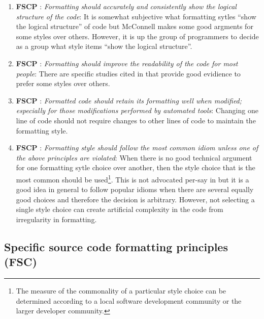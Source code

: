 \begin{enumerate}

{}\item{}\textbf{FSCP }:
{}\textit{Formatting should accurately and consistently show the logical
structure of the code}: It is somewhat subjective what formatting sytles
``show the logical structure'' of code but McConnell makes some good argments
for some styles over others.  However, it is up the group of programmers to
decide as a group what style items ``show the logical structure''.

{}\item{}\textbf{FSCP }:
{}\textit{Formatting should improve the readability of the code for most
people}: There are specific studies cited in {}\cite[Chapter
31]{CodeComplete2nd04} that provide good evidience to prefer some styles over
others.

{}\item{}\textbf{FSCP
}: {}\textit{Formatted code should retain its
formatting well when modified; especially for those modifications performed by
automated tools}: Changing one line of code should not require changes to
other lines of code to maintain the formatting style.

{}\item{}\textbf{FSCP
}: {}\textit{Formatting style should follow the
most common idiom unless one of the above principles are violated}: When there
is no good technical argument for one formatting sytle choice over another,
then the style choice that is the most common should be used\footnote{The
measure of the commonality of a particular style choice can be determined
according to a local software development community or the larger developer
community.}.  This is not advocated per-say in {}\cite[Chapter
31]{CodeComplete2nd04} but it is a good idea in general to follow popular
idioms when there are several equally good choices and therefore the decision
is arbitrary.  However, not selecting a single style choice can create
artificial complexity in the code from irregularity in formatting.

\end{enumerate}

%
\subsection{Specific source code formatting principles (FSC)}
%

